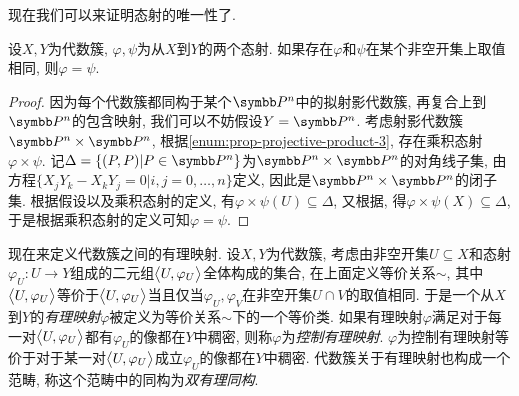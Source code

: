 现在我们可以来证明态射的唯一性了.

\begin{proposition}
    设$X, Y$为代数簇, $\varphi, \psi$为从$X$到$Y$的两个态射. 如果存在$\varphi$和$\psi$在某个非空开集上取值相同, 则$\varphi=\psi$.
\end{proposition}

\begin{proof}
    因为每个代数簇都同构于某个$\PP^n$中的拟射影代数簇, 再复合上到$\PP^n$的包含映射, 我们可以不妨假设$Y=\PP^n$. 考虑射影代数簇$\PP^n\times \PP^n$, 根据\ref{enum:prop-projective-product-3}, 存在乘积态射$\varphi\times \psi$. 记$\Delta=\{(P, P)\vert P\in \PP^n\}$为$\PP^n\times \PP^n$的对角线子集, 由方程$\{X_jY_k-X_kY_j=0\vert i, j=0, \dotsc, n\}$定义, 因此是$\PP^n\times \PP^n$的闭子集. 根据假设以及乘积态射的定义, 有$\varphi\times \psi(U)\subseteq \Delta$, 又根据, 得$\varphi\times \psi(X)\subseteq\Delta$, 于是根据乘积态射的定义可知$\varphi=\psi$.
\end{proof}

现在来定义代数簇之间的有理映射. 设$X, Y$为代数簇, 考虑由非空开集$U\subseteq X$和态射$\varphi_U\colon U\to Y$组成的二元组$\lrbig<>{U, \varphi_U}$全体构成的集合, 在上面定义等价关系$\sim$, 其中$\lrbig<>{U, \varphi_U}$等价于$\lrbig<>{U, \varphi_U}$当且仅当$\varphi_U, \varphi_V$在非空开集$U\cap V$的取值相同. 于是一个从$X$到$Y$的\emph{有理映射}$\varphi$被定义为等价关系$\sim$下的一个等价类. 如果有理映射$\varphi$满足对于每一对$\lrbig<>{U, \varphi_U}$都有$\varphi_U$的像都在$Y$中稠密, 则称$\varphi$为\emph{控制有理映射}. $\varphi$为控制有理映射等价于对于某一对$\lrbig<>{U, \varphi_U}$成立$\varphi_U$的像都在$Y$中稠密\parencite{andrew_how_2016}. 代数簇关于有理映射也构成一个范畴, 称这个范畴中的同构为\emph{双有理同构}.
